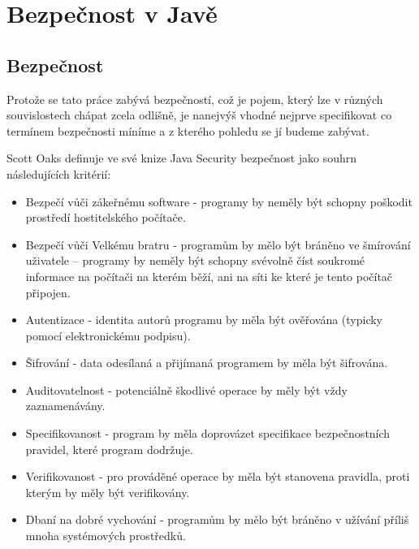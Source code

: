 
\chapter{Bezpečnost v Javě}

\section{Bezpečnost}

Protože se tato práce zabývá bezpečností, což je pojem, který lze v různých souvislostech chápat zcela odlišně, je nanejvýš vhodné nejprve specifikovat co termínem bezpečnosti míníme a z kterého pohledu se jí budeme zabývat.

Scott Oaks definuje ve své knize Java Security bezpečnost jako souhrn následujících kritérií: \cite[1.1]{oaks}

\begin{itemize}
  \item Bezpečí vůči zákeřnému software - programy by neměly být schopny poškodit prostředí hostitelského počítače.
  \item Bezpečí vůči Velkému bratru - programům by mělo být bráněno ve šmírování uživatele -- programy by neměly být schopny svévolně číst soukromé informace na počítači na kterém běží, ani na síti ke které je tento počítač připojen.
  \item Autentizace - identita autorů programu by měla být ověřována (typicky pomocí elektronickému podpisu).
  \item Šifrování - data odesílaná a přijímaná programem by měla být šifrována.
  \item Auditovatelnost - potenciálně škodlivé operace by měly být vždy zaznamenávány.
  \item Specifikovanost - program by měla doprovázet specifikace bezpečnostních pravidel, které program dodržuje.
  \item Verifikovanost - pro prováděné operace by měla být stanovena pravidla, proti kterým by měly být verifikovány.
  \item Dbaní na dobré vychování - programům by mělo být bráněno v užívání příliš mnoha systémových prostředků.
\end{itemize}

